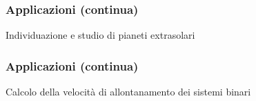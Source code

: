 \documentclass[10pt]{beamer}
\begin{document}
\begin{frame}
  \frametitle{Applicazioni (continua)}
  \begin{adv}
  \item Individuazione e studio di pianeti extrasolari
  \end{adv}
  \begin{center}
    \begin{tikzpicture}[scale=0.55,font=\scriptsize]
      
    \end{tikzpicture}
  \end{center}
\end{frame}

\begin{frame}
  \frametitle{Applicazioni (continua)}
  \begin{adv}
  \item Calcolo della velocità di allontanamento dei sistemi binari
  \end{adv}
\end{frame}
\end{document}
